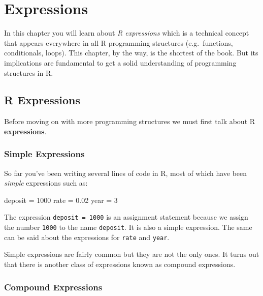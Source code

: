 \documentclass[
]{book}
\newenvironment{Shaded}{\begin{snugshade}}{\end{snugshade}}
\newcommand{\DecValTok}[1]{\textcolor[rgb]{0.00,0.00,0.81}{#1}}
\newcommand{\FloatTok}[1]{\textcolor[rgb]{0.00,0.00,0.81}{#1}}
\newcommand{\NormalTok}[1]{#1}
\newcommand{\OtherTok}[1]{\textcolor[rgb]{0.56,0.35,0.01}{#1}}
\begin{document}
\hypertarget{expressions}{%
\chapter{Expressions}\label{expressions}}

In this chapter you will learn about \emph{R expressions} which is a technical
concept that appears everywhere in all R programming structures (e.g.~functions,
conditionals, loops). This chapter, by the way, is the shortest of the book.
But its implications are fundamental to get a solid understanding of
programming structures in R.

\hypertarget{r-expressions}{%
\section{R Expressions}\label{r-expressions}}

Before moving on with more programming structures we must first talk about
R \textbf{expressions}.

\hypertarget{simple-expressions}{%
\subsection{Simple Expressions}\label{simple-expressions}}

So far you've been writing several lines of code in R, most of which have
been \emph{simple} expressions such as:

\begin{Shaded}
\begin{Highlighting}[]
\NormalTok{deposit }\OtherTok{=} \DecValTok{1000}
\NormalTok{rate }\OtherTok{=} \FloatTok{0.02}
\NormalTok{year }\OtherTok{=} \DecValTok{3}
\end{Highlighting}
\end{Shaded}

The expression \texttt{deposit\ =\ 1000} is an assignment statement because we assign
the number \texttt{1000} to the name \texttt{deposit}. It is also a simple expression.
The same can be said about the expressions for \texttt{rate} and \texttt{year}.

Simple expressions are fairly common but they are not the only ones. It turns
out that there is another class of expressions known as compound expressions.

\hypertarget{compound-expressions}{%
\subsection{Compound Expressions}\label{compound-expressions}}
\end{document}
